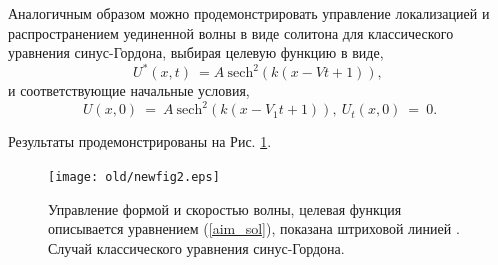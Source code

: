 Аналогичным образом можно продемонстрировать управление локализацией и распространением уединенной волны в виде солитона для классического уравнения синус-Гордона, выбирая целевую функцию в виде,
\begin{equation}
	U^*(x,t)~=A~ {\text{sech}}^2(k (x-V t+1)),~\label{aim_sol}
\end{equation}
и соответствующие начальные условия,
\begin{equation}
	U(x,0)~=~A~ {\text{sech}}^2(k (x-V_1 t+1)),~U_t (x,0)~=~0. \label{ic_sol}
\end{equation}

Результаты продемонстрированы на Рис. \ref{f:ris3}. 

\begin{figure}[!ht]
	\begin{center}
		\texttt{[image: old/newfig2.eps]}
	\end{center}
	\caption{\label{f:ris3}Управление формой и скоростью волны, целевая функция описывается уравнением (\ref{aim_sol}), показана штриховой линией \cite{porant16}. Случай классического уравнения синус-Гордона.}
\end{figure}

